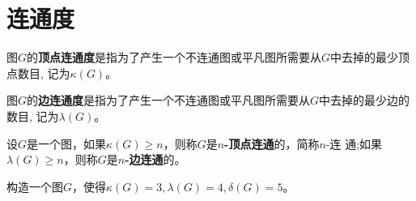 \chapter{连通度}
  \begin{Def}
    图$G$的{\bfseries 顶点连通度}是指为了产生一个不连通图或平凡图所需要从$G$中去掉的最少顶点数目, 记为$\kappa (G)$。
  \end{Def}
  \begin{Def}
    图$G$的{\bfseries 边连通度}是指为了产生一个不连通图或平凡图所需要从$G$中去掉的最少边的数目, 记为$\lambda (G)$。
  \end{Def}
  \begin{Def}
    设$G$是一个图，如果$\kappa (G) \geq n$，则称$G$是{\bfseries $n$-顶点连通}的，简称$n$-连
    通;如果$\lambda (G) \geq n$，则称$G$是{\bfseries $n$-边连通}的。
  \end{Def}

\begin{Ex}
  构造一个图$G$，使得$\kappa(G)=3,\lambda(G)=4,\delta(G)=5$。
\end{Ex}
